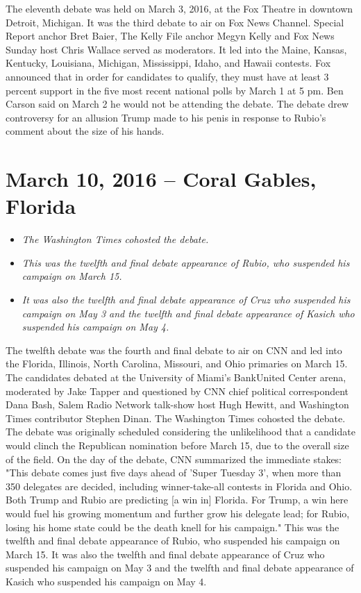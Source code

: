 The eleventh debate was held on March 3, 2016, at the Fox Theatre in
downtown Detroit, Michigan. It was the third debate to air on Fox News
Channel. Special Report anchor Bret Baier, The Kelly File anchor Megyn
Kelly and Fox News Sunday host Chris Wallace served as moderators. It
led into the Maine, Kansas, Kentucky, Louisiana, Michigan, Mississippi,
Idaho, and Hawaii contests. Fox announced that in order for candidates
to qualify, they must have at least 3 percent support in the five most
recent national polls by March 1 at 5 pm. Ben Carson said on March 2 he
would not be attending the debate. The debate drew controversy for an
allusion Trump made to his penis in response to Rubio's comment about
the size of his hands.

\section{March 10, 2016 -- Coral Gables,
Florida}\label{march-10-2016-coral-gables-florida}

\begin{itemize}
\item
  \emph{The Washington Times cohosted the debate.}
\item
  \emph{This was the twelfth and final debate appearance of Rubio, who
  suspended his campaign on March 15.}
\item
  \emph{It was also the twelfth and final debate appearance of Cruz who
  suspended his campaign on May 3 and the twelfth and final debate
  appearance of Kasich who suspended his campaign on May 4.}
\end{itemize}

The twelfth debate was the fourth and final debate to air on CNN and led
into the Florida, Illinois, North Carolina, Missouri, and Ohio primaries
on March 15. The candidates debated at the University of Miami's
BankUnited Center arena, moderated by Jake Tapper and questioned by CNN
chief political correspondent Dana Bash, Salem Radio Network talk-show
host Hugh Hewitt, and Washington Times contributor Stephen Dinan. The
Washington Times cohosted the debate. The debate was originally
scheduled considering the unlikelihood that a candidate would clinch the
Republican nomination before March 15, due to the overall size of the
field. On the day of the debate, CNN summarized the immediate stakes:
"This debate comes just five days ahead of 'Super Tuesday 3', when more
than 350 delegates are decided, including winner-take-all contests in
Florida and Ohio. Both Trump and Rubio are predicting {[}a win in{]}
Florida. For Trump, a win here would fuel his growing momentum and
further grow his delegate lead; for Rubio, losing his home state could
be the death knell for his campaign." This was the twelfth and final
debate appearance of Rubio, who suspended his campaign on March 15. It
was also the twelfth and final debate appearance of Cruz who suspended
his campaign on May 3 and the twelfth and final debate appearance of
Kasich who suspended his campaign on May 4.

